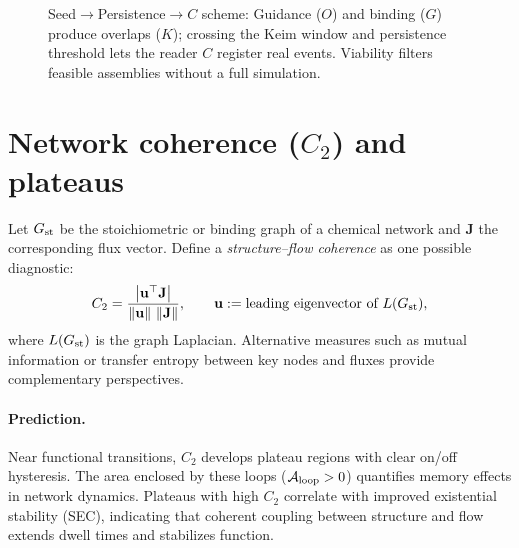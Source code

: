 \documentclass[12pt,a4paper,oneside]{scrreprt}
\def\Theta{Theta}%
\begin{document}
\begin{figure}[h]
\caption{Seed$\rightarrow$Persistence$\rightarrow C$ scheme: Guidance ($O$) and binding ($G$) produce overlaps ($K$); crossing the Keim window and persistence threshold lets the reader $C$ register real events. Viability filters feasible assemblies without a full simulation.}
\label{fig:keim-persistence-C}
\end{figure}

\section{Network coherence ($C_2$) and plateaus}\label{sec:network-coherence}

Let $G_{\rm st}$ be the stoichiometric or binding graph of a chemical network 
and $\mathbf J$ the corresponding flux vector. 
Define a \emph{structure--flow coherence} as one possible diagnostic:
\[
C_2=\frac{\left|\mathbf u^\top \mathbf J\right|}
          {\|\mathbf u\|\ \|\mathbf J\|},\qquad 
\mathbf u:=\text{leading eigenvector of }L(G_{\rm st}),
\]
where $L(G_{\rm st})$ is the graph Laplacian. 
Alternative measures such as mutual information or transfer entropy 
between key nodes and fluxes provide complementary perspectives. 

\paragraph{Prediction.} 
Near functional transitions, $C_2$ develops plateau regions 
with clear on/off hysteresis. 
The area enclosed by these loops ($\mathcal A_{\rm loop}>0$) 
quantifies memory effects in network dynamics. 
Plateaus with high $C_2$ correlate with improved existential stability (SEC), 
indicating that coherent coupling between structure and flow 
extends dwell times and stabilizes function. 
\end{document}
